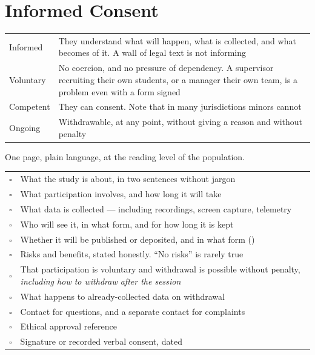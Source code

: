 \section{Informed Consent}

\begin{center}
\small
\begin{tabular}{@{}L{3.0cm}L{11.3cm}@{}}
\toprule
Informed  & They understand what will happen, what is collected, and what
            becomes of it. A wall of legal text is not informing \\
Voluntary & No coercion, and no pressure of dependency. A supervisor recruiting
            their own students, or a manager their own team, is a problem even
            with a form signed \\
Competent & They can consent. Note that in many jurisdictions minors cannot \\
Ongoing   & Withdrawable, at any point, without giving a reason and without
            penalty \\
\bottomrule
\end{tabular}
\end{center}

\begin{templatebox}
One page, plain language, at the reading level of the population.

\medskip
\begin{tabular}{@{}L{0.8cm}L{13.0cm}@{}}
$\square$ & What the study is about, in two sentences without jargon \\
$\square$ & What participation involves, and how long it will take \\
$\square$ & What data is collected --- including recordings, screen capture,
            telemetry \\
$\square$ & Who will see it, in what form, and for how long it is kept \\
$\square$ & Whether it will be published or deposited, and in what form
            () \\
$\square$ & Risks and benefits, stated honestly. ``No risks'' is rarely true \\
$\square$ & That participation is voluntary and withdrawal is possible without
            penalty, \emph{including how to withdraw after the session} \\
$\square$ & What happens to already-collected data on withdrawal \\
$\square$ & Contact for questions, and a separate contact for complaints \\
$\square$ & Ethical approval reference \\
$\square$ & Signature or recorded verbal consent, dated \\
\end{tabular}
\end{templatebox}

